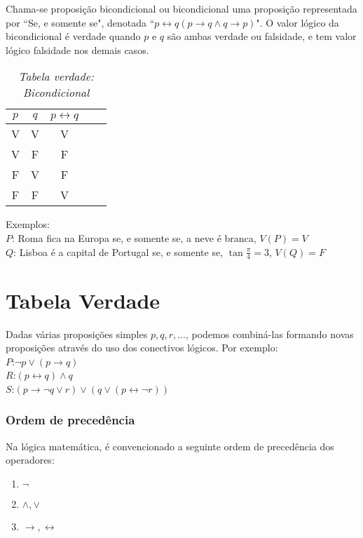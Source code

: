 \begin{definicao}[Bicondicional] Chama-se proposi{\c c}{\~a}o bicondicional ou bicondicional uma proposi{\c c}{\~a}o representada por ``Se, e somente se", denotada ``$p\leftrightarrow q(p\rightarrow q\wedge q\rightarrow p)$". O valor l{\'o}gico da bicondicional {\'e} verdade quando $p$ e $q$ s{\~a}o ambas verdade ou falsidade, e tem valor l{\'o}gico falsidade nos demais casos.\end{definicao}
\begin{table}[h]
   \centering 
   \setlength{\arrayrulewidth}{0,5\arrayrulewidth}
   \caption{\it Tabela verdade: Bicondicional}
   \begin{tabular}{|c|c|c|c|c|} 
      \hline
      $p$ & $q$ & $p\leftrightarrow q$ \\
     \hline
      V & V & V \\
      \hline
      V & F & F \\
      \hline
      F & V & F \\
      \hline
      F & F & V \\
      \hline
   \end{tabular}
\end{table}

Exemplos:\\
\textbf{$P$}: Roma fica na Europa se, e somente se, a neve {\'e} branca, $V(P)=V$\\
\textbf{$Q$}: Lisboa {\'e} a capital de Portugal se, e somente se, $\tan\displaystyle\frac{\pi}{4}=3$, $V(Q)=F$
\section{Tabela Verdade}

\hspace{0,5cm}Dadas v{\'a}rias proposi{\c c}{\~o}es simples $p,q,r,...$, podemos combin{\'a}-las formando novas proposi{\c c}{\~o}es atrav{\'e}s do uso dos conectivos l{\'o}gicos. Por exemplo:\\
\textbf{$P$}:$\neg p\vee(p\rightarrow q)$\\
\textbf{$R$}:$(p\leftrightarrow q)\wedge q$\\
\textbf{$S$}:$(p\rightarrow\neg q\vee r)\vee(q\vee(p\leftrightarrow\neg r))$

\subsubsection{Ordem de preced{\^e}ncia}

Na l{\'o}gica matem{\'a}tica, {\'e} convencionado a seguinte ordem de preced{\^e}ncia dos operadores:
\begin{enumerate}
\item $\neg$
\item $\wedge,\vee$
\item $\rightarrow,\leftrightarrow$
\end{enumerate}

